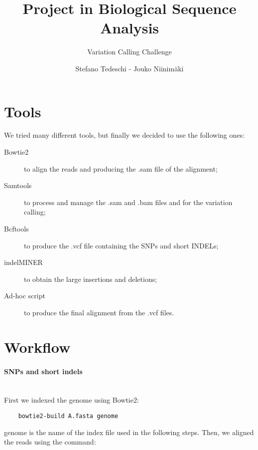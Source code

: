 \documentclass[10pt,a4paper,oneside]{scrartcl}
\begin{document}
	\title{Project in Biological Sequence Analysis}
	\subtitle{Variation Calling Challenge}
	\author{Stefano Tedeschi - Jouko Niinimäki}
	\maketitle

	\section*{Tools}
	
	We tried many different tools, but finally we decided to use the following ones:
	
	\begin{description}
		
		\item[Bowtie2] to align the reads and producing the .sam file of the alignment;
		
		\item[Samtools] to process and manage the .sam and .bam files and for the variation calling;
		
		\item[Bcftools] to produce the .vcf file containing the SNPs and short INDELs;
		
		\item[indelMINER] to obtain the large insertions and deletions;
		
		\item[Ad-hoc script] to produce the final alignment from the .vcf files.
			
	\end{description}
	
	\section*{Workflow}
	
	\paragraph*{SNPs and short indels}\hspace{0pt} \\
	
	First we indexed the genome using Bowtie2:
	
	\begin{lstlisting}
	bowtie2-build A.fasta genome
	\end{lstlisting}
	genome is the name of the index file used in the following steps.
	Then, we aligned the reads using the command:
	
\end{document}
